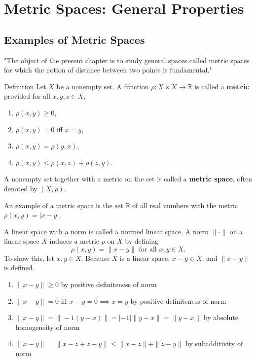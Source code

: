 \chapter{Metric Spaces: General Properties}

\section{Examples of Metric Spaces}
\begin{flushleft}

"The object of the present chapter is to study general spaces called metric spaces for which the notion of distance between two points is fundamental."

\begin{namedthm*}{Definition}
    Let $X$ be a nonempty set. A function $\rho:X\times X\to\mathbb{R}$ is called a \textbf{metric} provided for all $x,y,z\in X$,
    \begin{enumerate}[label=(\roman*),align=right]
        \item $\rho(x,y)\ge0$,
        \item $\rho(x,y)=0$ iff $x=y$,
        \item $\rho(x,y)=\rho(y,x)$,
        \item $\rho(x,y)\le\rho(x,z)+\rho(z,y)$.
    \end{enumerate}
    A nonempty set together with a metric on the set is called a \textbf{metric space}, often denoted by $(X,\rho)$.
\end{namedthm*}

An example of a metric space is the set $\mathbb{R}$ of all real numbers with the metric $\rho(x,y) = |x-y|$. \par\medskip

A linear space with a norm is called a normed linear space.
A norm $\|\cdot\|$ on a linear space $X$ induces a metric $\rho$ on $X$ by defining
\[
    \rho(x,y)=\|x-y\|\text{ for all }x,y\in X.  
\]
To show this, let $x,y\in X$. Because $X$ is a linear space, $x-y \in X$, and $\|x-y\|$ is defined.
\begin{enumerate}[label=(\roman*),align=right]
    \item $\|x-y\|\ge0$ by positive definiteness of norm
    \item $\|x-y\|=0$ iff $x-y=0 \implies x=y$ by positive definiteness of norm
    \item $\|x-y\|=\|-1(y-x)\|=|-1|\|y-x\|=\|y-x\|$ by absolute homogeneity of norm
    \item $\|x-y\|= \|x-z+z-y\|\le\|x-z\|+\|z-y\|$ by subadditivity of norm
\end{enumerate}


\end{flushleft}
